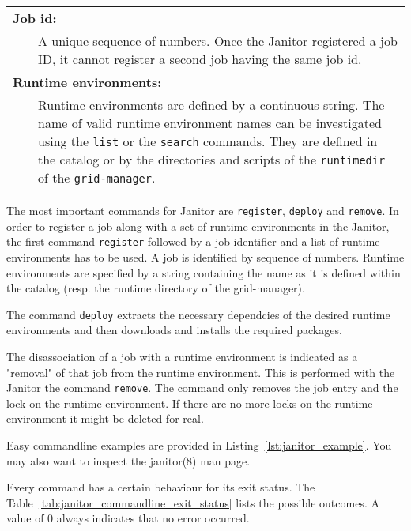 \begin{table}[!h]
\begin{center}
\begin{tabular}{p{0.5cm}p{2cm}p{11cm}}
	\multicolumn{3}{l}{\textbf{Job id:}}\\
	&					& A unique sequence of numbers. Once the Janitor registered a job ID, it cannot register a second job having the same job id.\\
	\multicolumn{3}{l}{\textbf{Runtime environments:}}\\
	&					& Runtime environments are defined by a continuous string. The name of valid runtime environment names can be investigated using the \texttt{list} or the \texttt{search} commands. They are defined in the catalog or by the directories and scripts of the \texttt{runtimedir} of the \texttt{grid-manager}.\\
	\end{tabular} 
   \end{center}
\end{table}
The most important commands for Janitor are \texttt{register}, \texttt{deploy} and \texttt{remove}. In order to 
register a job along with a set of runtime environments in the Janitor, the first command \texttt{register} followed
by a job identifier and a list of runtime environments has to be used.
A job is identified by sequence of numbers. Runtime environments are specified by a string containing the name as it is defined 
within the catalog (resp. the runtime directory of the grid-manager).

The command \texttt{deploy} extracts the necessary dependcies of the desired runtime environments and then downloads and installs 
the required packages. %

The disassociation of a job with a runtime environment is indicated as a "removal" of that job from the runtime environment.
This is performed with the Janitor the command \texttt{remove}. 
The command only removes the job entry and the lock on the runtime environment. If there are no more locks on the runtime environment
it might be deleted for real.

Easy commandline examples are provided in Listing~\ref{lst:janitor_example}. You may also want to inspect the janitor(8) man page.

Every command has a certain behaviour for its exit status. The Table~\ref{tab:janitor_commandline_exit_status} lists the possible
outcomes. A value of 0 always indicates that no error occurred.


